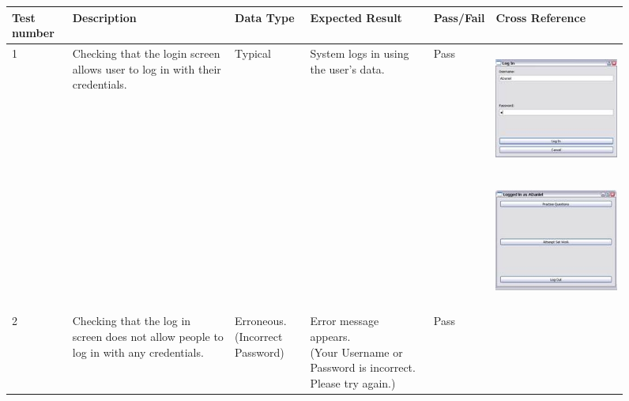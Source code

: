 \documentclass[letterpaper]{article}
\begin{document}
\begin{figure}[hbp]
\begin{minipage}{12.1146in}
\begin{flushleft}
\begin{supertabular}{|m{0.8913598in}|m{1.0997599in}|m{3.3018599in}|m{0.8809598in}|m{0.6198598in}|m{4.84626in}|}
{%
%
%
Test number} &
{\color{black} Description} &
{\color{black} Data Type } &
{\color{black} Expected Result} &
{\color{black} Pass/Fail} &
{\color{black} Cross Reference}\\\hline
{\color{black} 1} &
{\color{black} Checking that the login screen allows user to log in with their credentials.} &
{\color{black} Typical} &
{\color{black} System logs in using the user's data.} &
{\color{black} Pass} &
 \includegraphics[width=2.0417in,height=1.6457in]{Tests_files/image001.jpg} 
\includegraphics[width=2.0937in,height=1.7291in]{Tests_files/image002.jpg} \\\hline
{\color{black} 2} &
{\color{black} Checking that the log in screen does not allow people to log in with any credentials.} &
{\color{black} Erroneous.\newline
(Incorrect Password)} &
{\color{black} Error message appears.\newline
(Your Username or Password is incorrect. Please try again.)} &
{\color{black} Pass} &
{\color{black} ~}


\end{supertabular}
\end{flushleft}
\end{minipage}
\end{figure}
\end{document}
